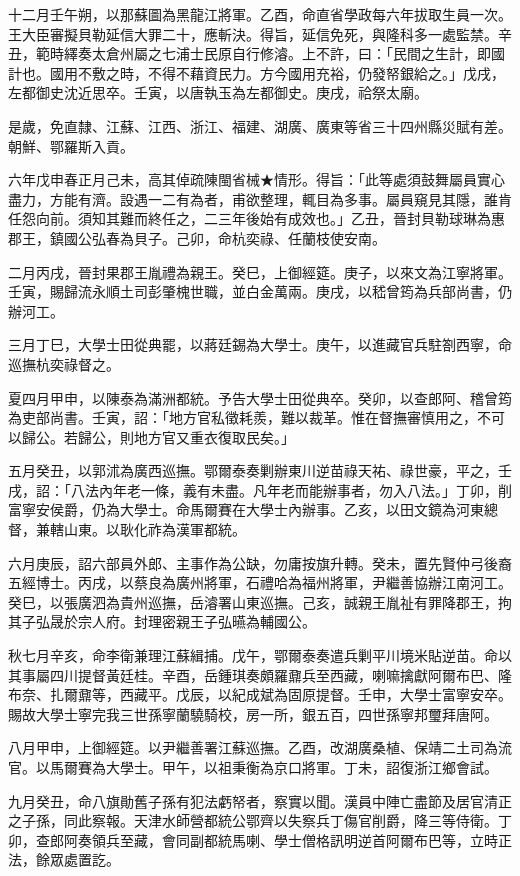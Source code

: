 \begin{pinyinscope}
十二月壬午朔，以那蘇圖為黑龍江將軍。乙酉，命直省學政每六年拔取生員一次。王大臣審擬貝勒延信大罪二十，應斬決。得旨，延信免死，與隆科多一處監禁。辛丑，範時繹奏太倉州屬之七浦士民原自行修濬。上不許，曰：「民間之生計，即國計也。國用不敷之時，不得不藉資民力。方今國用充裕，仍發帑銀給之。」戊戌，左都御史沈近思卒。壬寅，以唐執玉為左都御史。庚戌，祫祭太廟。

是歲，免直隸、江蘇、江西、浙江、福建、湖廣、廣東等省三十四州縣災賦有差。朝鮮、鄂羅斯入貢。

六年戊申春正月己未，高其倬疏陳閩省械★情形。得旨：「此等處須鼓舞屬員實心盡力，方能有濟。設遇一二有為者，甫欲整理，輒目為多事。屬員窺見其隱，誰肯任怨向前。須知其難而終任之，二三年後始有成效也。」乙丑，晉封貝勒球琳為惠郡王，鎮國公弘春為貝子。己卯，命杭奕祿、任蘭枝使安南。

二月丙戌，晉封果郡王胤禮為親王。癸巳，上御經筵。庚子，以來文為江寧將軍。壬寅，賜歸流永順土司彭肇槐世職，並白金萬兩。庚戌，以嵇曾筠為兵部尚書，仍辦河工。

三月丁巳，大學士田從典罷，以蔣廷錫為大學士。庚午，以進藏官兵駐劄西寧，命巡撫杭奕祿督之。

夏四月甲申，以陳泰為滿洲都統。予告大學士田從典卒。癸卯，以查郎阿、稽曾筠為吏部尚書。壬寅，詔：「地方官私徵耗羨，難以裁革。惟在督撫審慎用之，不可以歸公。若歸公，則地方官又重衣復取民矣。」

五月癸丑，以郭沭為廣西巡撫。鄂爾泰奏剿辦東川逆苗祿天祐、祿世豪，平之，壬戌，詔：「八法內年老一條，義有未盡。凡年老而能辦事者，勿入八法。」丁卯，削富寧安侯爵，仍為大學士。命馬爾賽在大學士內辦事。乙亥，以田文鏡為河東總督，兼轄山東。以耿化祚為漢軍都統。

六月庚辰，詔六部員外郎、主事作為公缺，勿庸按旗升轉。癸未，置先賢仲弓後裔五經博士。丙戌，以蔡良為廣州將軍，石禮哈為福州將軍，尹繼善協辦江南河工。癸巳，以張廣泗為貴州巡撫，岳濬署山東巡撫。己亥，誠親王胤祉有罪降郡王，拘其子弘晟於宗人府。封理密親王子弘曣為輔國公。

秋七月辛亥，命李衛兼理江蘇緝捕。戊午，鄂爾泰奏遣兵剿平川境米貼逆苗。命以其事屬四川提督黃廷桂。辛酉，岳鍾琪奏頗羅鼐兵至西藏，喇嘛擒獻阿爾布巴、隆布奈、扎爾鼐等，西藏平。戊辰，以紀成斌為固原提督。壬申，大學士富寧安卒。賜故大學士寧完我三世孫寧蘭驍騎校，房一所，銀五百，四世孫寧邦璽拜唐阿。

八月甲申，上御經筵。以尹繼善署江蘇巡撫。乙酉，改湖廣桑植、保靖二土司為流官。以馬爾賽為大學士。甲午，以祖秉衡為京口將軍。丁未，詔復浙江鄉會試。

九月癸丑，命八旗勛舊子孫有犯法虧帑者，察實以聞。漢員中陣亡盡節及居官清正之子孫，同此察報。天津水師營都統公鄂齊以失察兵丁傷官削爵，降三等侍衛。丁卯，查郎阿奏領兵至藏，會同副都統馬喇、學士僧格訊明逆首阿爾布巴等，立時正法，餘眾處置訖。


\end{pinyinscope}
